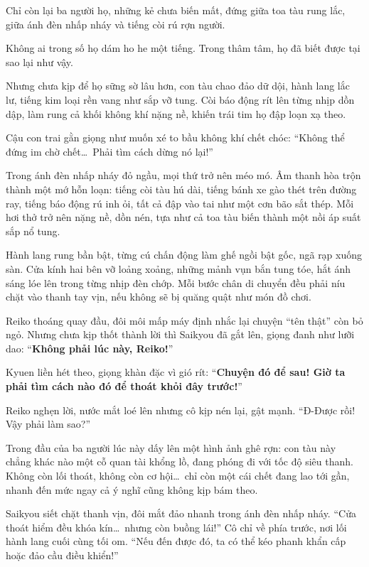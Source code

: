 \documentclass[../main.tex]{subfiles}
\begin{document}
Chỉ còn lại ba người họ, những kẻ chưa biến mất, đứng giữa toa tàu rung lắc, giữa ánh đèn nhấp nháy và tiếng còi rú rợn người.

Không ai trong số họ dám ho he một tiếng. Trong thâm tâm, họ đã biết được tại sao lại như vậy.

Nhưng chưa kịp để họ sững sờ lâu hơn, con tàu chao đảo dữ dội, hành lang lắc lư, tiếng kim loại rền vang như sắp vỡ tung. Còi báo động rít lên từng nhịp dồn dập, làm rung cả khối không khí nặng nề, khiến trái tim họ đập loạn xạ theo.

Cậu con trai gằn giọng như muốn xé to bầu không khí chết chóc: ``Không thể đứng im chờ chết\dots\ Phải tìm cách dừng nó lại!''

Trong ánh đèn nhấp nháy đỏ ngầu, mọi thứ trở nên méo mó. Âm thanh hòa trộn thành một mớ hỗn loạn: tiếng còi tàu hú dài, tiếng bánh xe gào thét trên đường ray, tiếng báo động rú inh ỏi, tất cả đập vào tai như một cơn bão sắt thép. Mỗi hơi thở trở nên nặng nề, dồn nén, tựa như cả toa tàu biến thành một nồi áp suất sắp nổ tung.

Hành lang rung bần bật, từng cú chấn động làm ghế ngồi bật gốc, ngã rạp xuống sàn. Cửa kính hai bên vỡ loảng xoảng, những mảnh vụn bắn tung tóe, hắt ánh sáng lóe lên trong từng nhịp đèn chớp. Mỗi bước chân di chuyển đều phải níu chặt vào thanh tay vịn, nếu không sẽ bị quăng quật như món đồ chơi.

Reiko thoáng quay đầu, đôi môi mấp máy định nhắc lại chuyện ``tên thật'' còn bỏ ngỏ. Nhưng chưa kịp thốt thành lời thì Saikyou đã gắt lên, giọng đanh như lưỡi dao: ``\textbf{Không phải lúc này, Reiko!}''

Kyuen liền hét theo, giọng khàn đặc vì gió rít: ``\textbf{Chuyện đó để sau! Giờ ta phải tìm cách nào đó để thoát khỏi đây trước!}''

Reiko nghẹn lời, nước mắt loé lên nhưng cô kịp nén lại, gật mạnh. ``Đ-Được rồi! Vậy phải làm sao?''

Trong đầu của ba người lúc này dấy lên một hình ảnh ghê rợn: con tàu này chẳng khác nào một cỗ quan tài khổng lồ, đang phóng đi với tốc độ siêu thanh. Không còn lối thoát, không còn cơ hội\dots\ chỉ còn một cái chết đang lao tới gần, nhanh đến mức ngay cả ý nghĩ cũng không kịp bám theo.

Saikyou siết chặt thanh vịn, đôi mắt đảo nhanh trong ánh đèn nhấp nháy. ``Cửa thoát hiểm đều khóa kín\dots\ nhưng còn buồng lái!'' Cô chỉ về phía trước, nơi lối hành lang cuối cùng tối om. ``Nếu đến được đó, ta có thể kéo phanh khẩn cấp hoặc đảo cầu điều khiển!''
\end{document}
